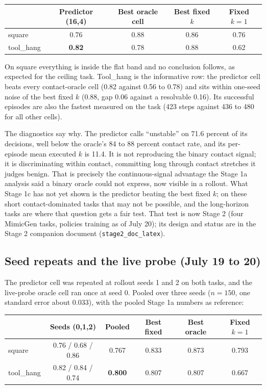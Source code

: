 \documentclass[11pt]{article}
\begin{document}
\begin{center}
\small
\begin{tabular}{@{}lcccc@{}}
\toprule
 & Predictor (16,4) & Best oracle cell & Best fixed $k$ & Fixed $k{=}1$ \\
\midrule
square     & 0.76 & 0.88 & 0.86 & 0.76 \\
tool\_hang & \textbf{0.82} & 0.78 & 0.88 & 0.62 \\
\bottomrule
\end{tabular}
\end{center}

On square everything is inside the flat band and no conclusion follows, as
expected for the ceiling task. Tool\_hang is the informative row: the predictor
cell beats every contact-oracle cell (0.82 against 0.56 to 0.78) and sits within
one-seed noise of the best fixed $k$ (0.88, gap 0.06 against a resolvable 0.16).
Its successful episodes are also the fastest measured on the task (423 steps
against 436 to 480 for all other cells).

The diagnostics say why. The predictor calls ``unstable'' on 71.6 percent of its
decisions, well below the oracle's 84 to 88 percent contact rate, and its
per-episode mean executed $k$ is 11.4. It is not reproducing the binary contact
signal; it is discriminating within contact, committing long through contact
stretches it judges benign. That is precisely the continuous-signal advantage the
Stage 1a analysis said a binary oracle could not express, now visible in a
rollout. What Stage 1c has not yet shown is the predictor beating the best fixed
$k$; on these short contact-dominated tasks that may not be possible, and the
long-horizon tasks are where that question gets a fair test. That test is now
Stage 2 (four MimicGen tasks, policies training as of July 20); its design and
status are in the Stage 2 companion document (\texttt{stage2\_doc\_latex}).

\subsection{Seed repeats and the live probe (July 19 to 20)}

The predictor cell was repeated at rollout seeds 1 and 2 on both tasks, and the
live-probe oracle cell ran once at seed 0. Pooled over three seeds
($n{=}150$, one standard error about 0.033), with the pooled Stage 1a numbers as
reference:

\begin{center}
\small
\begin{tabular}{@{}lccccc@{}}
\toprule
 & Seeds (0,1,2) & Pooled & Best fixed & Best oracle & Fixed $k{=}1$ \\
\midrule
square     & 0.76 / 0.68 / 0.86 & 0.767 & 0.833 & 0.873 & 0.793 \\
tool\_hang & 0.82 / 0.84 / 0.74 & \textbf{0.800} & 0.807 & 0.807 & 0.667 \\
\bottomrule
\end{tabular}
\end{center}
\end{document}
